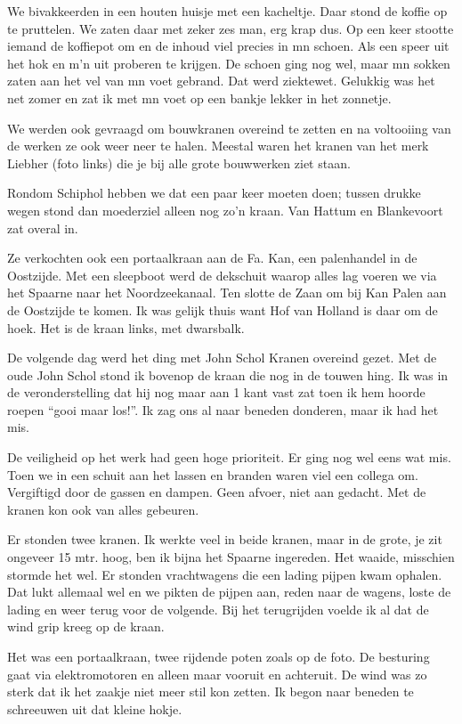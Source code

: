\documentclass[10pt,twoside,openright]{memoir}
\begin{document}
We bivakkeerden in een houten huisje met een kacheltje. Daar stond de koffie op te pruttelen. We zaten daar met zeker zes man, erg krap dus. Op een keer stootte iemand de koffiepot om en de inhoud viel precies in mn schoen. Als een speer uit het hok en m’n uit proberen te krijgen. De schoen ging nog wel, maar mn sokken zaten aan het vel van mn voet gebrand. Dat werd ziektewet. Gelukkig was het net zomer en zat ik met mn voet op een bankje lekker in het zonnetje.

We werden ook gevraagd om bouwkranen overeind te zetten en na voltooiing van de werken ze ook weer neer te halen. Meestal waren het kranen van het merk Liebher (foto links) die je bij alle grote bouwwerken ziet staan. 

Rondom Schiphol hebben we dat een paar keer moeten doen; tussen drukke wegen stond dan moederziel alleen nog zo’n kraan. Van Hattum en Blankevoort zat overal in.

Ze verkochten ook een portaalkraan aan de Fa. Kan, een palenhandel in de Oostzijde. Met een sleepboot werd de dekschuit waarop alles lag voeren we via het Spaarne naar het Noordzeekanaal. Ten slotte de Zaan om bij Kan Palen aan de Oostzijde te komen. Ik was gelijk thuis want Hof van Holland is daar om de hoek. Het is de kraan links, met dwarsbalk. 

De volgende dag werd het ding met John Schol Kranen overeind gezet. Met de oude John Schol stond ik bovenop de kraan die nog in de touwen hing. Ik was in de veronderstelling dat hij nog maar aan 1 kant vast zat toen ik hem hoorde roepen “gooi maar los!”. Ik zag ons al naar beneden donderen, maar ik had het mis. 

De veiligheid op het werk had geen hoge prioriteit. Er ging nog wel eens wat mis. Toen we in een schuit aan het lassen en branden waren viel een collega om. Vergiftigd door de gassen en dampen. Geen afvoer, niet aan gedacht. Met de kranen kon ook van alles gebeuren. 

Er stonden twee kranen. Ik werkte veel in beide kranen, maar in de grote, je zit ongeveer 15 mtr. hoog, ben ik bijna het Spaarne ingereden. Het waaide, misschien stormde het wel. Er stonden vrachtwagens die een lading pijpen kwam ophalen. Dat lukt allemaal wel en we pikten de pijpen aan, reden naar de wagens, loste de lading en weer terug voor de volgende. Bij het terugrijden voelde ik al dat de wind grip kreeg op de kraan. 

Het was een portaalkraan, twee rijdende poten zoals op de foto. De besturing gaat via elektromotoren en alleen maar vooruit en achteruit. De wind was zo sterk dat ik het zaakje niet meer stil kon zetten. Ik begon naar beneden te schreeuwen uit dat kleine hokje. 
\end{document}

